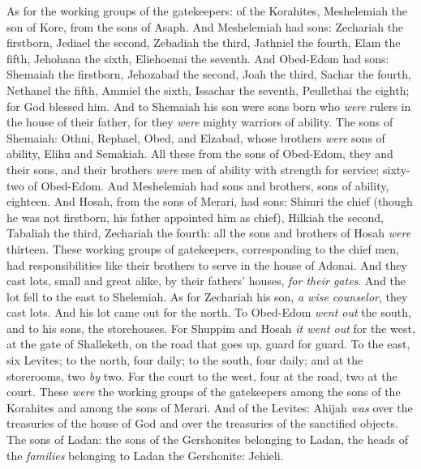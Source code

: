 \begin{biblechapter} %
 As for the working groups of the gatekeepers: of the Korahites, Meshelemiah the son of Kore, from the sons of Asaph.
\verse And Meshelemiah had sons: Zechariah the firstborn, Jediael the second, Zebadiah the third, Jathniel the fourth,
\verse Elam the fifth, Jehohana the sixth, Eliehoenai the seventh.
\verse And Obed-Edom had sons: Shemaiah the firstborn, Jehozabad the second, Joah the third, Sachar the fourth, Nethanel the fifth,
\verse Ammiel the sixth, Issachar the seventh, Peullethai the eighth; for God blessed him.
\verse And to Shemaiah his son were sons born who \textit{were} rulers in the house of their father, for they \textit{were} mighty warriors of ability.
\verse The sons of Shemaiah: Othni, Rephael, Obed, and Elzabad, whose brothers \textit{were} sons of ability, Elihu and Semakiah.
\verse All these from the sons of Obed-Edom, they and their sons, and their brothers \textit{were} men of ability with strength for service; sixty-two of Obed-Edom.
\verse And Meshelemiah had sons and brothers, sons of ability, eighteen.
\verse And Hosah, from the sons of Merari, had sons: Shimri the chief (though he was not firstborn, his father appointed him as chief),
\verse Hilkiah the second, Tabaliah the third, Zechariah the fourth: all the sons and brothers of Hosah \textit{were} thirteen.
\verse These working groups of gatekeepers, corresponding to the chief men, had responsibilities like their brothers to serve in the house of Adonai.
\verse And they cast lots, small and great alike, by their fathers’ houses, \textit{for their gates}.
\verse And the lot fell to the east to Shelemiah. As for Zechariah his son, \textit{a wise counselor}, they cast lots. And his lot came out for the north.
\verse To Obed-Edom \textit{went out} the south, and to his sons, the storehouses.
\verse For Shuppim and Hosah \textit{it went out} for the west, at the gate of Shalleketh, on the road that goes up, guard for guard.
\verse To the east, six Levites; to the north, four daily; to the south, four daily; and at the storerooms, two \textit{by} two.
\verse For the court to the west, four at the road, two at the court.
\verse These \textit{were} the working groups of the gatekeepers among the sons of the Korahites and among the sons of Merari.
 And of the Levites: Ahijah \textit{was} over the treasuries of the house of God and over the treasuries of the sanctified objects.
\verse The sons of Ladan: the sons of the Gershonites belonging to Ladan, the heads of the \textit{families} belonging to Ladan the Gershonite: Jehieli.

\end{biblechapter}
